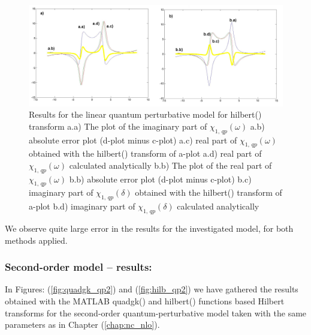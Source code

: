 \documentclass[12pt,twoside,a4paper]{article}
\numberwithin{equation}{subsection}
\numberwithin{figure}{subsection}
\begin{document}
\begin{figure}
  \includegraphics[width=150mm]{img/hilb_qp1.png}
  \caption{Results for the linear quantum perturbative model for hilbert() transform
    a.a) The plot of the imaginary part of ${\chi_{1, \, qp}}(\omega )$
    a.b) absolute error plot (d-plot minus c-plot) 
    a.c) real part of ${\chi_{1, \, qp}}(\omega )$ obtained with the hilbert()  transform of a-plot 
    a.d) real part of ${\chi_{1, \, qp}}(\omega )$ calculated analytically 
    b.b) The plot of the real part of ${\chi_{1, \, qp}}(\omega )$ 
    b.b) absolute error plot (d-plot minus c-plot) 
    b.c) imaginary part of ${\chi_{1, \, qp}}(\delta )$ obtained with the hilbert()  transform of a-plot 
    b.d) imaginary part of ${\chi_{1, \, qp}}(\delta )$ calculated analytically  
    \label{fig:hilb_qp1}
  }
\end{figure}

We observe quite large error in the results for the investigated model, for both methods applied. 

\subsubsection*{Second-order model -- results:}

In Figures: (\ref{fig:quadgk_qp2}) and (\ref{fig:hilb_qp2}) we have ga\-thered the results ob\-tained with the MATLAB quadgk() and hilbert() func\-tions based Hil\-bert transforms for the se\-cond\--order quan\-tum\--per\-tur\-bative model taken with the same para\-meters as in Chapter (\ref{chap:nc_nlo}).
\end{document}
